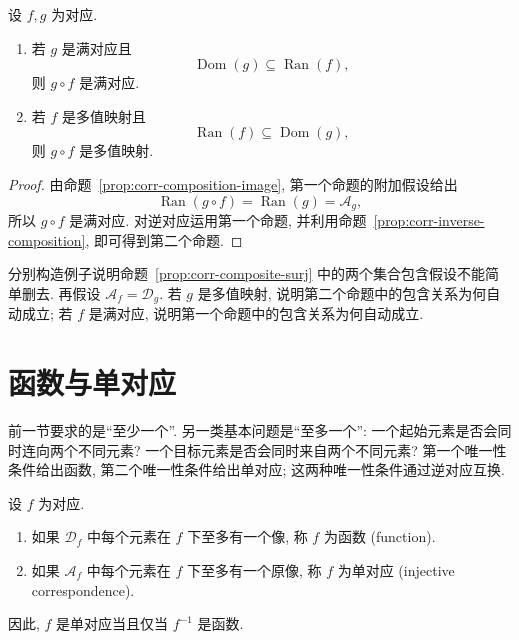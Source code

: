\documentclass[usesamecnt, thmcnt=section, lang=cn, newtx, 10pt, scheme=chinese]{elegantbook}
\begin{document}
\begin{proposition}\label{prop:corr-composite-surj}
设 $f,g$ 为对应.
\begin{enumerate}[label=\rm(\arabic*)]
  \item 若 $g$ 是满对应且
  \[
   \operatorname{Dom}(g)\subseteq\operatorname{Ran}(f),
  \]
  则 $g\circ f$ 是满对应.
  \item 若 $f$ 是多值映射且
  \[
   \operatorname{Ran}(f)\subseteq\operatorname{Dom}(g),
  \]
  则 $g\circ f$ 是多值映射.
\end{enumerate}
\end{proposition}

\begin{proof}
由命题~\ref{prop:corr-composition-image}, 第一个命题的附加假设给出
\[
 \operatorname{Ran}(g\circ f)=\operatorname{Ran}(g)=\mathscr A_g,
\]
所以 $g\circ f$ 是满对应. 对逆对应运用第一个命题, 并利用命题~\ref{prop:corr-inverse-composition}, 即可得到第二个命题.
\end{proof}

\begin{exercise}\label{ex:corr-composite-surj}
分别构造例子说明命题~\ref{prop:corr-composite-surj} 中的两个集合包含假设不能简单删去. 再假设 $\mathscr A_f=\mathscr D_g$. 若 $g$ 是多值映射, 说明第二个命题中的包含关系为何自动成立; 若 $f$ 是满对应, 说明第一个命题中的包含关系为何自动成立.
\end{exercise}

\section{函数与单对应}

前一节要求的是``至少一个''. 另一类基本问题是``至多一个'': 一个起始元素是否会同时连向两个不同元素? 一个目标元素是否会同时来自两个不同元素? 第一个唯一性条件给出函数, 第二个唯一性条件给出单对应; 这两种唯一性条件通过逆对应互换.

\begin{definition}[函数与单对应]\label{def:corr-single-injective}
设 $f$ 为对应.
\begin{enumerate}[label=\rm(\arabic*)]
  \item 如果 $\mathscr D_f$ 中每个元素在 $f$ 下至多有一个像, 称 $f$ 为{\color{blue}函数 (function)}.
  \item 如果 $\mathscr A_f$ 中每个元素在 $f$ 下至多有一个原像, 称 $f$ 为{\color{blue}单对应 (injective correspondence)}.
\end{enumerate}
因此, $f$ 是单对应当且仅当 $f^{-1}$ 是函数.
\end{definition}
\end{document}
